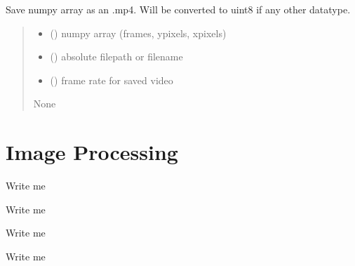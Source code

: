 \documentclass[letterpaper,10pt,english]{sphinxmanual}
\begin{document}

\begin{fulllineitems}
\label{\detokenize{CalSciPy.io_tools:CalSciPy.io_tools.save_video}}
\pysigstartsignatures
{}
\pysigstopsignatures
\sphinxAtStartPar
Save numpy array as an .mp4. Will be converted to uint8 if any other datatype.
\begin{quote}\begin{description}
\begin{itemize}
\item {} 
\sphinxAtStartPar
{} () \sphinxhyphen{}\sphinxhyphen{} numpy array (frames, y\sphinxhyphen{}pixels, x\sphinxhyphen{}pixels)

\item {} 
\sphinxAtStartPar
{} () \sphinxhyphen{}\sphinxhyphen{} absolute filepath or filename

\item {} 
\sphinxAtStartPar
{} () \sphinxhyphen{}\sphinxhyphen{} frame rate for saved video

\end{itemize}

\sphinxAtStartPar
None

\end{description}\end{quote}

\end{fulllineitems}



\section{Image Processing}
\label{\detokenize{Sub-Packages:image-processing}}\label{\detokenize{Sub-Packages:image-processing-module}}
\begin{DUlineblock}{0em}
\item[] Write me
\item[] Write me
\item[] Write me
\item[] Write me
\end{DUlineblock}
\end{document}
